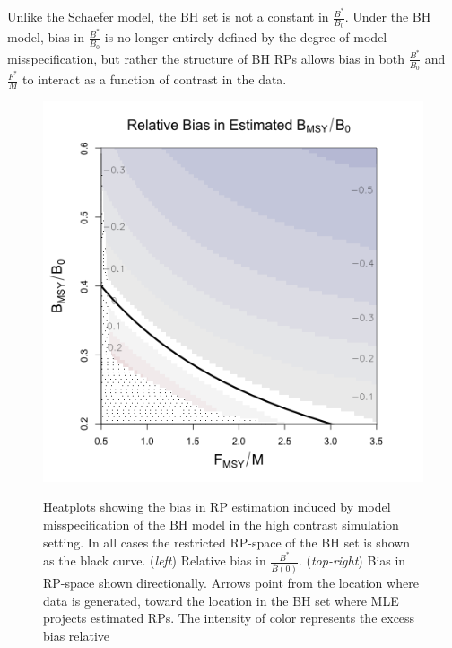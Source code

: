 %
Unlike the Schaefer model, the BH set is not a constant in
$\frac{B^*}{B_0}$. Under the BH model, bias in $\frac{B^*}{B_0}$ is no
longer entirely defined by the degree of model misspecification, but rather the
structure of BH RPs allows bias in both $\frac{B^*}{B_0}$ and $\frac{F^*}{M}$
to interact as a function of contrast in the data.

%
\begin{figure}[h!]
\begin{minipage}[h!]{0.46\textwidth}
\hspace*{-0.5cm}
\includegraphics[width=1.175\textwidth]{../gpBias/zetaRelBiasSchnuteExpT45N150Wide.png}\\
\hspace*{1cm}
\vspace{-1cm}
\caption{\label{contrastTrio}
Heatplots showing the bias in RP estimation induced by model misspecification of
the BH model in the high contrast simulation setting.
In all cases the restricted RP-space of the BH set is shown as the black curve.
(\emph{left}) Relative bias in $\frac{B^*}{\bar B(0)}$.  (\emph{top-right})
Bias in RP-space shown directionally. Arrows point from the location where
data is generated, toward the location in the BH set where MLE projects estimated
RPs. The intensity of color represents the excess bias relative
}
\end{minipage}
\end{figure}
